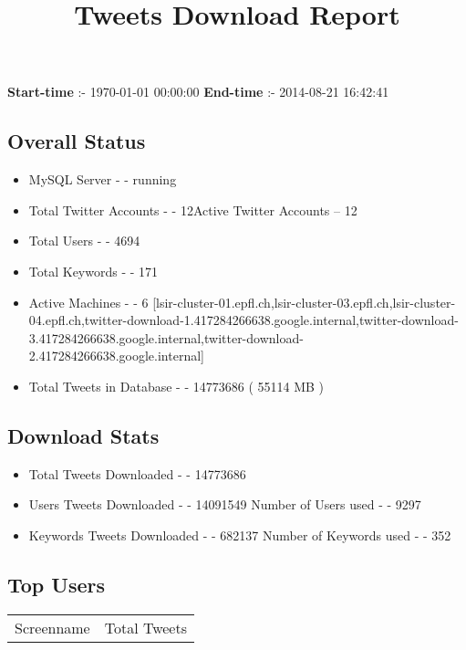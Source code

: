 \documentclass{article}\usepackage[T1]{fontenc}
\begin{document}
\title{\textbf{Tweets Download Report}}
               \date{}
                \maketitle
               \centerline{\textbf{Start-time} :- 1970-01-01 00:00:00 \hspace{40pt} \textbf{End-time} :- 2014-08-21 16:42:41}               \subsection*{Overall Status}                \begin{itemize}                \item MySQL Server - - running               \item Total Twitter Accounts - - 12\newline Active Twitter Accounts -- 12               \item Total Users - - 4694               \item Total Keywords - - 171               \item Active Machines - - 6 [lsir-cluster-01.epfl.ch,lsir-cluster-03.epfl.ch,lsir-cluster-04.epfl.ch,twitter-download-1.417284266638.google.internal,twitter-download-3.417284266638.google.internal,twitter-download-2.417284266638.google.internal]               \item Total Tweets in Database - - 14773686 ( 55114 MB )               \end{itemize}               \subsection*{Download Stats}                \begin{itemize}                \item Total Tweets Downloaded - - 14773686               \item Users Tweets Downloaded - - 14091549 \newline Number of Users used - - 9297               \item Keywords Tweets Downloaded - - 682137 \newline Number of Keywords used - - 352              \end{itemize}              \subsection*{Top Users}\begin{tabular}{|c|c|}         \hline         Screenname & Total Tweets \\ 

\end{tabular}
\end{document}
